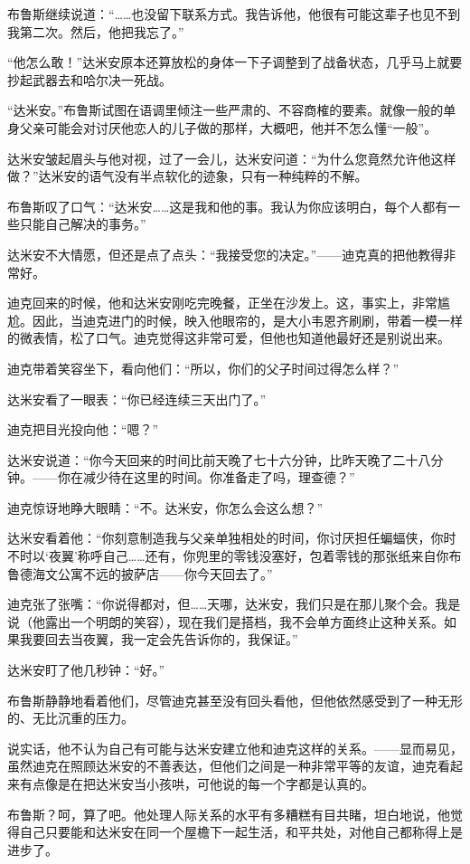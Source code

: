\documentclass[../main]{subfiles}
\begin{document}
布鲁斯继续说道：“……也没留下联系方式。我告诉他，他很有可能这辈子也见不到我第二次。然后，他把我忘了。”

“他怎么敢！”达米安原本还算放松的身体一下子调整到了战备状态，几乎马上就要抄起武器去和哈尔决一死战。

“达米安。”布鲁斯试图在语调里倾注一些严肃的、不容商榷的要素。就像一般的单身父亲可能会对讨厌他恋人的儿子做的那样，大概吧，他并不怎么懂“一般”。

达米安皱起眉头与他对视，过了一会儿，达米安问道：“为什么您竟然允许他这样做？”达米安的语气没有半点软化的迹象，只有一种纯粹的不解。

布鲁斯叹了口气：“达米安……这是我和他的事。我认为你应该明白，每个人都有一些只能自己解决的事务。”

达米安不大情愿，但还是点了点头：“我接受您的决定。”——迪克真的把他教得非常好。

迪克回来的时候，他和达米安刚吃完晚餐，正坐在沙发上。这，事实上，非常尴尬。因此，当迪克进门的时候，映入他眼帘的，是大小韦恩齐刷刷，带着一模一样的微表情，松了口气。迪克觉得这非常可爱，但他也知道他最好还是别说出来。

迪克带着笑容坐下，看向他们：“所以，你们的父子时间过得怎么样？”

达米安看了一眼表：“你已经连续三天出门了。”

迪克把目光投向他：“嗯？”

达米安说道：“你今天回来的时间比前天晚了七十六分钟，比昨天晚了二十八分钟。——你在减少待在这里的时间。你准备走了吗，理查德？”

迪克惊讶地睁大眼睛：“不。达米安，你怎么会这么想？”

达米安看着他：“你刻意制造我与父亲单独相处的时间，你讨厌担任蝙蝠侠，你时不时以`夜翼'称呼自己……还有，你兜里的零钱没塞好，包着零钱的那张纸来自你布鲁德海文公寓不远的披萨店——你今天回去了。”

迪克张了张嘴：“你说得都对，但……天哪，达米安，我们只是在那儿聚个会。我是说（他露出一个明朗的笑容），现在我们是搭档，我不会单方面终止这种关系。如果我要回去当夜翼，我一定会先告诉你的，我保证。”

达米安盯了他几秒钟：“好。”

布鲁斯静静地看着他们，尽管迪克甚至没有回头看他，但他依然感受到了一种无形的、无比沉重的压力。

说实话，他不认为自己有可能与达米安建立他和迪克这样的关系。——显而易见，虽然迪克在照顾达米安的不善表达，但他们之间是一种非常平等的友谊，迪克看起来有点像是在把达米安当小孩哄，可他说的每一个字都是认真的。

布鲁斯？呵，算了吧。他处理人际关系的水平有多糟糕有目共睹，坦白地说，他觉得自己只要能和达米安在同一个屋檐下一起生活，和平共处，对他自己都称得上是进步了。
\end{document}
